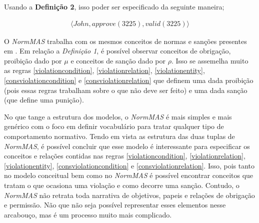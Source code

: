 Usando a \textbf{Definição 2}, isso poder ser especificado da seguinte maneira; 

\begin{eqnarray} 
    \langle John, approve(3225), valid(3225)\rangle
\end{eqnarray}

O \textit{NormMAS} trabalha com os mesmos conceitos de normas e sanções presentes em \cite{dastaniframework}. Em relação a \textit{Definição 1}, é possível observar conceitos de obrigação, proibição dado por $ \mu $ e conceitos de sanção dado por $\rho$. Isso se assemelha muito as regras \ref{violationcondition}, \ref{violationrelation}, \ref{violationentity}, \ref{consviolationcondition} e \ref{consviolationrelation} que definem uma dada proibição (pois essas regras trabalham sobre o que não deve ser feito) e uma dada sanção (que define uma punição).

No que tange a estrutura dos modelos, o \textit{NormMAS} é mais simples e mais genérico com o foco em definir vocabulário para tratar qualquer tipo de comportamento normativo. Tendo em vista as estrutura das duas tuplas de \textit{NormMAS}, é possível concluir que esse modelo é interessante para especificar os conceitos e relações contidas nas regras \ref{violationcondition}, \ref{violationrelation}, \ref{violationentity}, \ref{consviolationcondition} e \ref{consviolationrelation}. Isso, pois tanto no modelo conceitual bem como no \textit{NormMAS} é possível encontrar conceitos que tratam o que ocasiona uma violação e como decorre uma sanção. Contudo, o \textit{NormMAS} não retrata toda narrativa de objetivos, papeis e relações de obrigação e permissão. Não que não seja possível representar esses elementos nesse arcabouço, mas é um processo muito mais complicado.  